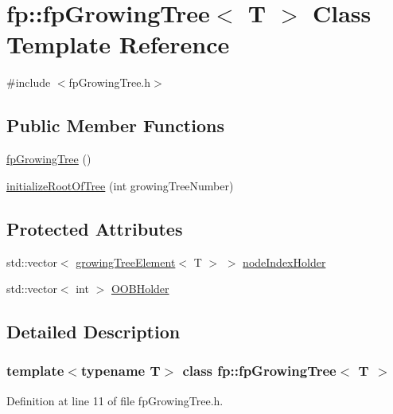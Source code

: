 \hypertarget{classfp_1_1fpGrowingTree}{}\section{fp\+:\+:fp\+Growing\+Tree$<$ T $>$ Class Template Reference}
\label{classfp_1_1fpGrowingTree}


{\ttfamily \#include $<$fp\+Growing\+Tree.\+h$>$}

\subsection*{Public Member Functions}
\begin{DoxyCompactItemize}
\item 
\hyperlink{classfp_1_1fpGrowingTree_a7704cdb870c23913b5247de052f2c635}{fp\+Growing\+Tree} ()
\item 
\hyperlink{classfp_1_1fpGrowingTree_a5762c272db68e2e28c767053f752418f}{initialize\+Root\+Of\+Tree} (int growing\+Tree\+Number)
\end{DoxyCompactItemize}
\subsection*{Protected Attributes}
\begin{DoxyCompactItemize}
\item 
std\+::vector$<$ \hyperlink{classfp_1_1growingTreeElement}{growing\+Tree\+Element}$<$ T $>$ $>$ \hyperlink{classfp_1_1fpGrowingTree_ad729a18d4cd23d38a5bcab4bdd1ed58b}{node\+Index\+Holder}
\item 
std\+::vector$<$ int $>$ \hyperlink{classfp_1_1fpGrowingTree_afdd5b18a4e4f282e3c5aba30caf918c0}{O\+O\+B\+Holder}
\end{DoxyCompactItemize}


\subsection{Detailed Description}
\subsubsection*{template$<$typename T$>$\newline
class fp\+::fp\+Growing\+Tree$<$ T $>$}



Definition at line 11 of file fp\+Growing\+Tree.\+h.



